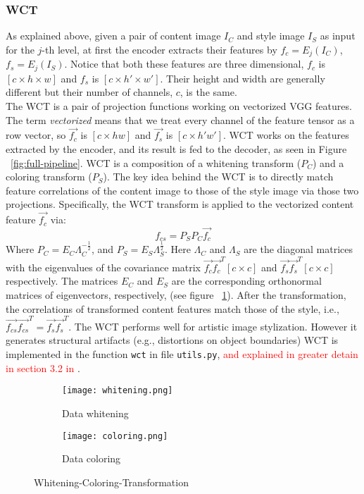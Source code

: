 \subsubsection{WCT} As explained above, given a pair of content image $I_C$ and style image $I_S$ as input for the $j$-th level, at first the encoder extracts their features by $f_c = E_j(I_C)$, $f_s = E_j(I_S)$. Notice that both these features are three dimensional, $f_c$ is $[c\times h \times w]$ and $f_s$ is $[c\times h' \times w']$. Their height and width are generally different but their number of channels, $c$, is the same.\\
The WCT is a pair of projection functions working on vectorized VGG features. The term \textit{vectorized} means that we treat every channel of the feature tensor as a row vector, so $\vec{f_c}$ is $[c \times hw]$ and $\vec{f_s}$ is $[c \times h'w']$. WCT works on the features extracted by the encoder, and its result is fed to the decoder, as seen in Figure ~\ref{fig:full-pipeline}. WCT is a composition of a whitening transform ($P_C$) and a coloring transform ($P_S$). The key idea behind the WCT is to directly match feature correlations of the content image to those of the style image via those two projections. Specifically, the WCT transform is applied to the vectorized content feature $\vec{f_c}$ via:
\begin{equation}
f_{cs} = P_S P_C \vec{f_c}
\end{equation}
Where $P_C=E_C\Lambda_C^{-\frac{1}{2}}$, and $P_S=E_S\Lambda_S^{\frac{1}{2}}$. Here $\Lambda_C$ and $\Lambda_S$ are the diagonal matrices with the eigenvalues of the covariance matrix $\vec{f_c} \vec{f_c}^T [c\times c]$ and $\vec{f_s} \vec{f_s}^T [c\times c]$ respectively. The matrices $E_C$ and $E_S$ are the corresponding orthonormal matrices of eigenvectors, respectively, (see figure ~\ref{fig:WCT-vis}). After the transformation, the correlations of transformed content features match those of the style, i.e., $\vec{f_{cs}} \vec{f_{cs}}^T = \vec{f_s} \vec{f_s}^T$.
The WCT performs well for artistic image stylization. However it generates
structural artifacts (e.g., distortions on object boundaries)
WCT is implemented in the function \texttt{wct} in file \texttt{utils.py}, \textcolor{red}{and explained in greater detain in section 3.2 in \cite{bib11}}.

\begin{figure}[h!]
	\centering
	\begin{subfigure}[b]{0.4\linewidth}
		\texttt{[image: whitening.png]}
		\caption{Data whitening}
	\end{subfigure}
	\begin{subfigure}[b]{0.4\linewidth}
		\texttt{[image: coloring.png]}
		\caption{Data coloring}
	\end{subfigure}
	\caption{Whitening-Coloring-Transformation}
	\label{fig:WCT-vis}
\end{figure}